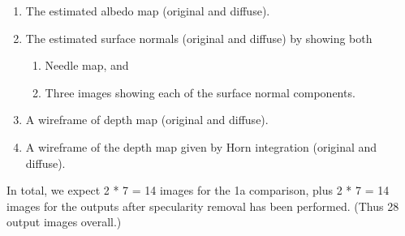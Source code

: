 \documentclass[11pt]{article}
\providecommand{\tightlist}{%
      \setlength{\itemsep}{0pt}\setlength{\parskip}{0pt}}
\begin{document}
\begin{enumerate}
\def\labelenumi{\arabic{enumi}.}
\item
  The estimated albedo map (original and diffuse).
\item
  The estimated surface normals (original and diffuse) by showing both

  \begin{enumerate}
  \def\labelenumii{\arabic{enumii}.}
  \tightlist
  \item
    Needle map, and
  \item
    Three images showing each of the surface normal components.
  \end{enumerate}
\item
  A wireframe of depth map (original and diffuse).
\item
  A wireframe of the depth map given by Horn integration (original and
  diffuse).
\end{enumerate}

In total, we expect 2 * 7 = 14 images for the 1a comparison, plus 2 * 7
= 14 images for the outputs after specularity removal has been
performed. (Thus 28 output images overall.)
\end{document}
